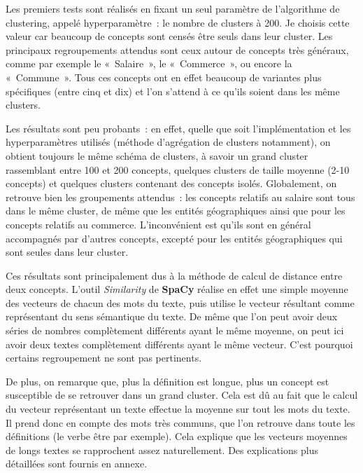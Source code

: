 Les premiers tests sont réalisés en fixant un seul paramètre de l'algorithme de clustering, appelé hyperparamètre~: le nombre de clusters à 200. Je choisis cette valeur car beaucoup de concepts sont censés être seuls dans leur cluster. Les principaux regroupements attendus sont ceux autour de concepts très généraux, comme par exemple le «~Salaire~», le «~Commerce~», ou encore la «~Commune~». Tous ces concepts ont en effet beaucoup de variantes plus spécifiques (entre cinq et dix) et l'on s'attend à ce qu'ils soient dans les même clusters.
\newline

Les résultats sont peu probants~: en effet, quelle que soit l'implémentation et les hyperparamètres utilisés (méthode d'agrégation de clusters notamment), on obtient toujours le même schéma de clusters, à savoir un grand cluster rassemblant entre 100 et 200 concepts, quelques clusters de taille moyenne (2-10 concepts) et quelques clusters contenant des concepts isolés. Globalement, on retrouve bien les groupements attendus~: les concepts relatifs au salaire sont tous dans le même cluster, de même que les entités géographiques ainsi que pour les concepts relatifs au commerce. L'inconvénient est qu'ils sont en général accompagnés par d'autres concepts, excepté pour les entités géographiques qui sont seules dans leur cluster.
\newline

Ces résultats sont principalement dus à la méthode de calcul de distance entre deux concepts. L'outil \textit{Similarity} de \textbf{SpaCy} réalise en effet une simple moyenne des vecteurs de chacun des mots du texte, puis utilise le vecteur résultant comme représentant du sens sémantique du texte. De même que l'on peut avoir deux séries de nombres complètement différents ayant le même moyenne, on peut ici avoir deux textes complètement différents ayant le même vecteur. C'est pourquoi certains regroupement ne sont pas pertinents.

De plus, on remarque que, plus la définition est longue, plus un concept est susceptible de se retrouver dans un grand cluster. Cela est dû au fait que le calcul du vecteur représentant un texte effectue la moyenne sur tout les mots du texte. Il prend donc en compte des mots très communs, que l'on retrouve dans toute les définitions (le verbe être par exemple). Cela explique que les vecteurs moyennes de longs textes se rapprochent assez naturellement. Des explications plus détaillées sont fournis en annexe. 
\newline

